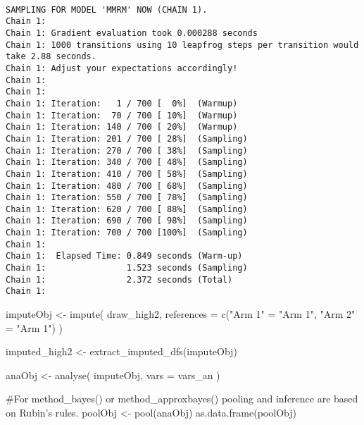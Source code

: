 \documentclass[
  letterpaper,
  DIV=11,
  numbers=noendperiod]{scrreprt}
\newenvironment{Shaded}{\begin{snugshade}}{\end{snugshade}}
\newcommand{\AttributeTok}[1]{\textcolor[rgb]{0.40,0.45,0.13}{#1}}
\newcommand{\CommentTok}[1]{\textcolor[rgb]{0.37,0.37,0.37}{#1}}
\newcommand{\FunctionTok}[1]{\textcolor[rgb]{0.28,0.35,0.67}{#1}}
\newcommand{\NormalTok}[1]{\textcolor[rgb]{0.00,0.23,0.31}{#1}}
\newcommand{\OtherTok}[1]{\textcolor[rgb]{0.00,0.23,0.31}{#1}}
\newcommand{\StringTok}[1]{\textcolor[rgb]{0.13,0.47,0.30}{#1}}
\begin{document}
\begin{verbatim}

SAMPLING FOR MODEL 'MMRM' NOW (CHAIN 1).
Chain 1: 
Chain 1: Gradient evaluation took 0.000288 seconds
Chain 1: 1000 transitions using 10 leapfrog steps per transition would take 2.88 seconds.
Chain 1: Adjust your expectations accordingly!
Chain 1: 
Chain 1: 
Chain 1: Iteration:   1 / 700 [  0%]  (Warmup)
Chain 1: Iteration:  70 / 700 [ 10%]  (Warmup)
Chain 1: Iteration: 140 / 700 [ 20%]  (Warmup)
Chain 1: Iteration: 201 / 700 [ 28%]  (Sampling)
Chain 1: Iteration: 270 / 700 [ 38%]  (Sampling)
Chain 1: Iteration: 340 / 700 [ 48%]  (Sampling)
Chain 1: Iteration: 410 / 700 [ 58%]  (Sampling)
Chain 1: Iteration: 480 / 700 [ 68%]  (Sampling)
Chain 1: Iteration: 550 / 700 [ 78%]  (Sampling)
Chain 1: Iteration: 620 / 700 [ 88%]  (Sampling)
Chain 1: Iteration: 690 / 700 [ 98%]  (Sampling)
Chain 1: Iteration: 700 / 700 [100%]  (Sampling)
Chain 1: 
Chain 1:  Elapsed Time: 0.849 seconds (Warm-up)
Chain 1:                1.523 seconds (Sampling)
Chain 1:                2.372 seconds (Total)
Chain 1: 
\end{verbatim}

\begin{Shaded}
\begin{Highlighting}[]
\NormalTok{imputeObj }\OtherTok{\textless{}{-}} \FunctionTok{impute}\NormalTok{(}
\NormalTok{  draw\_high2,}
  \AttributeTok{references =} \FunctionTok{c}\NormalTok{(}\StringTok{"Arm 1"} \OtherTok{=} \StringTok{"Arm 1"}\NormalTok{, }\StringTok{"Arm 2"} \OtherTok{=} \StringTok{"Arm 1"}\NormalTok{)}
\NormalTok{)}

\NormalTok{imputed\_high2 }\OtherTok{\textless{}{-}} \FunctionTok{extract\_imputed\_dfs}\NormalTok{(imputeObj)}

\NormalTok{anaObj }\OtherTok{\textless{}{-}} \FunctionTok{analyse}\NormalTok{(}
\NormalTok{  imputeObj,}
  \AttributeTok{vars =}\NormalTok{ vars\_an}
\NormalTok{)}

\CommentTok{\#For method\_bayes() or method\_approxbayes() pooling and inference are based on Rubin’s rules.}
\NormalTok{poolObj }\OtherTok{\textless{}{-}} \FunctionTok{pool}\NormalTok{(anaObj)}
\FunctionTok{as.data.frame}\NormalTok{(poolObj)}
\end{Highlighting}
\end{Shaded}
\end{document}
